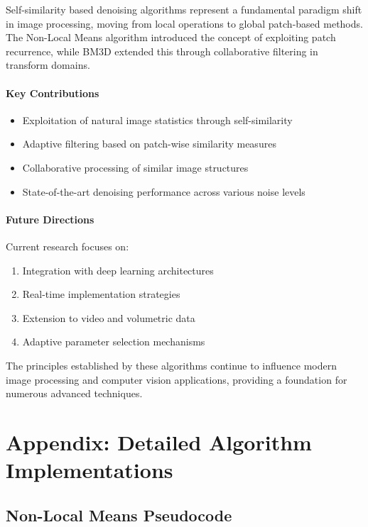 \documentclass[12pt]{article}
\begin{document}
Self-similarity based denoising algorithms represent a fundamental paradigm shift in image processing, moving from local operations to global patch-based methods. The Non-Local Means algorithm introduced the concept of exploiting patch recurrence, while BM3D extended this through collaborative filtering in transform domains.

\paragraph{Key Contributions}
\begin{itemize}
    \item Exploitation of natural image statistics through self-similarity
    \item Adaptive filtering based on patch-wise similarity measures
    \item Collaborative processing of similar image structures
    \item State-of-the-art denoising performance across various noise levels
\end{itemize}

\paragraph{Future Directions}
Current research focuses on:
\begin{enumerate}
    \item Integration with deep learning architectures
    \item Real-time implementation strategies
    \item Extension to video and volumetric data
    \item Adaptive parameter selection mechanisms
\end{enumerate}

The principles established by these algorithms continue to influence modern image processing and computer vision applications, providing a foundation for numerous advanced techniques.

\newpage

\section{Appendix: Detailed Algorithm Implementations}
\label{sec:appendix}

\subsection{Non-Local Means Pseudocode}
\label{subsec:nlm_pseudocode}
\end{document}
